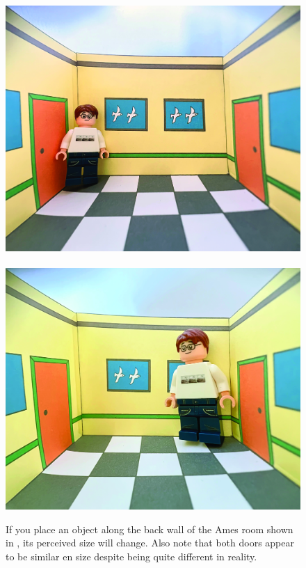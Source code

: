 \begin{figure}[t]
\centerline{
\includegraphics[width=.49\linewidth]{figures/single_view_3d/IMG_9148_small.jpeg}
~
\includegraphics[width=.494\linewidth]{figures/single_view_3d/IMG_9150_large.jpeg}
}
\caption{If you place an object along the back wall of the Ames room shown in \fig{\ref{fig:ames_room}}, its perceived size will change. Also note that both doors appear to be similar en size despite being quite different in reality.}
\label{fig:ames_room_cat}
\end{figure}

